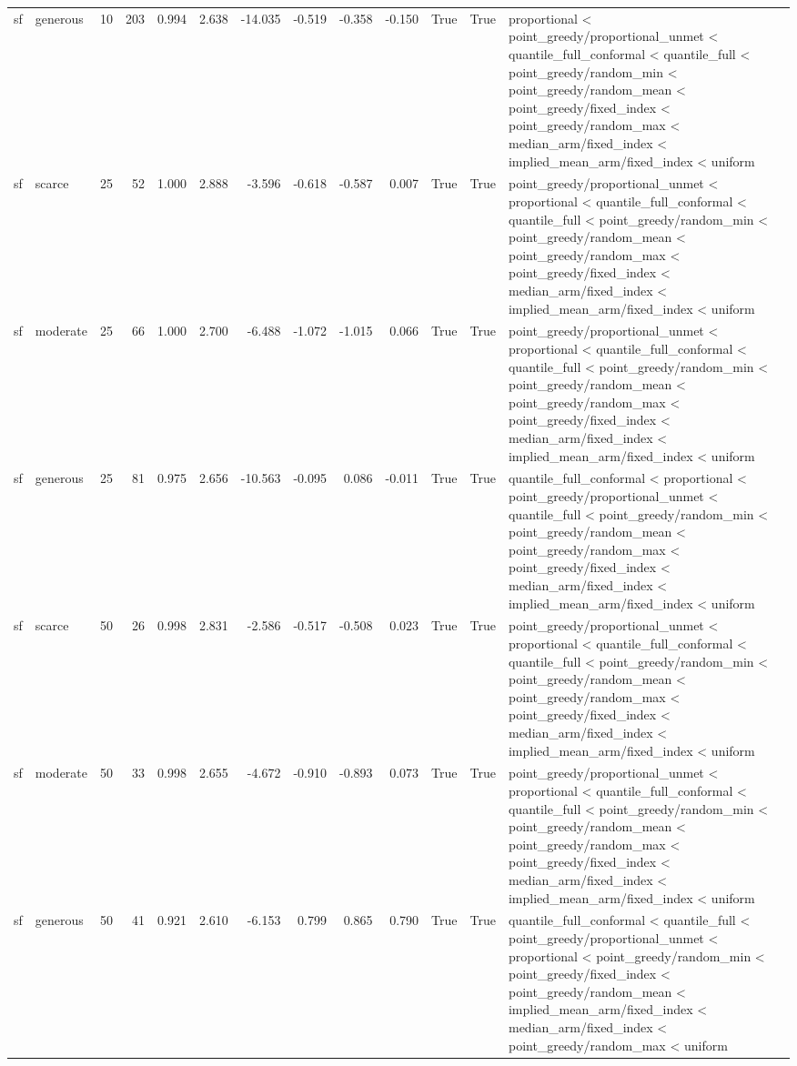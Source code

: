 \begin{tabular}{llrrrrrrrrrrl}
sf & generous & 10 & 203 & 0.994 & 2.638 & -14.035 & -0.519 & -0.358 & -0.150 & True & True & proportional < point\_greedy/proportional\_unmet < quantile\_full\_conformal < quantile\_full < point\_greedy/random\_min < point\_greedy/random\_mean < point\_greedy/fixed\_index < point\_greedy/random\_max < median\_arm/fixed\_index < implied\_mean\_arm/fixed\_index < uniform \\
sf & scarce & 25 & 52 & 1.000 & 2.888 & -3.596 & -0.618 & -0.587 & 0.007 & True & True & point\_greedy/proportional\_unmet < proportional < quantile\_full\_conformal < quantile\_full < point\_greedy/random\_min < point\_greedy/random\_mean < point\_greedy/random\_max < point\_greedy/fixed\_index < median\_arm/fixed\_index < implied\_mean\_arm/fixed\_index < uniform \\
sf & moderate & 25 & 66 & 1.000 & 2.700 & -6.488 & -1.072 & -1.015 & 0.066 & True & True & point\_greedy/proportional\_unmet < proportional < quantile\_full\_conformal < quantile\_full < point\_greedy/random\_min < point\_greedy/random\_mean < point\_greedy/random\_max < point\_greedy/fixed\_index < median\_arm/fixed\_index < implied\_mean\_arm/fixed\_index < uniform \\
sf & generous & 25 & 81 & 0.975 & 2.656 & -10.563 & -0.095 & 0.086 & -0.011 & True & True & quantile\_full\_conformal < proportional < point\_greedy/proportional\_unmet < quantile\_full < point\_greedy/random\_min < point\_greedy/random\_mean < point\_greedy/random\_max < point\_greedy/fixed\_index < median\_arm/fixed\_index < implied\_mean\_arm/fixed\_index < uniform \\
sf & scarce & 50 & 26 & 0.998 & 2.831 & -2.586 & -0.517 & -0.508 & 0.023 & True & True & point\_greedy/proportional\_unmet < proportional < quantile\_full\_conformal < quantile\_full < point\_greedy/random\_min < point\_greedy/random\_mean < point\_greedy/random\_max < point\_greedy/fixed\_index < median\_arm/fixed\_index < implied\_mean\_arm/fixed\_index < uniform \\
sf & moderate & 50 & 33 & 0.998 & 2.655 & -4.672 & -0.910 & -0.893 & 0.073 & True & True & point\_greedy/proportional\_unmet < proportional < quantile\_full\_conformal < quantile\_full < point\_greedy/random\_min < point\_greedy/random\_mean < point\_greedy/random\_max < point\_greedy/fixed\_index < median\_arm/fixed\_index < implied\_mean\_arm/fixed\_index < uniform \\
sf & generous & 50 & 41 & 0.921 & 2.610 & -6.153 & 0.799 & 0.865 & 0.790 & True & True & quantile\_full\_conformal < quantile\_full < point\_greedy/proportional\_unmet < proportional < point\_greedy/random\_min < point\_greedy/fixed\_index < point\_greedy/random\_mean < implied\_mean\_arm/fixed\_index < median\_arm/fixed\_index < point\_greedy/random\_max < uniform \\

\end{tabular}
